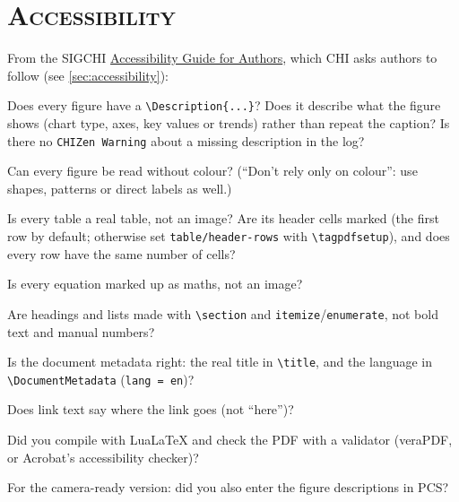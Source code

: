 \noindent\makebox[\linewidth]{\rule{\linewidth}{0.4pt}}
\section*{\textsc{Accessibility}}
From the SIGCHI \href{https://sigchi.org/resources/guides-for-authors/accessibility/}{Accessibility Guide for Authors}, which CHI asks authors to follow (see \autoref{sec:accessibility}):
\begin{checklist}
    \item Does every figure have a \texttt{\textbackslash Description\{...\}}? Does it describe what the figure shows (chart type, axes, key values or trends) rather than repeat the caption? Is there no \texttt{CHIZen Warning} about a missing description in the log?
    \item Can every figure be read without colour? (``Don't rely only on colour'': use shapes, patterns or direct labels as well.)
    \item Is every table a real table, not an image? Are its header cells marked (the first row by default; otherwise set \texttt{table/header-rows} with \texttt{\textbackslash tagpdfsetup}), and does every row have the same number of cells?
    \item Is every equation marked up as maths, not an image?
    \item Are headings and lists made with \texttt{\textbackslash section} and \texttt{itemize}/\texttt{enumerate}, not bold text and manual numbers?
    \item Is the document metadata right: the real title in \texttt{\textbackslash title}, and the language in \texttt{\textbackslash DocumentMetadata} (\texttt{lang = en})?
    \item Does link text say where the link goes (not ``here'')?
    \item Did you compile with LuaLaTeX and check the PDF with a validator (veraPDF, or Acrobat's accessibility checker)?
    \item For the camera-ready version: did you also enter the figure descriptions in PCS?
\end{checklist}


\noindent\makebox[\linewidth]{\rule{\linewidth}{0.4pt}}
